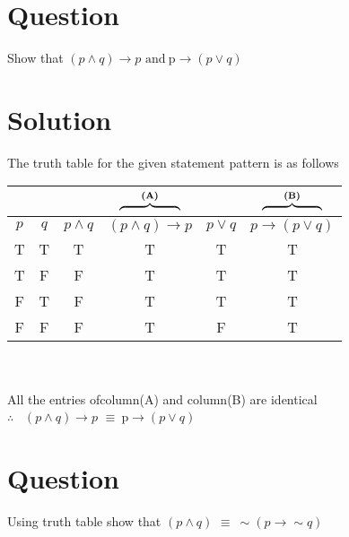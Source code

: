 \documentclass[17pt]{extarticle}
\newcommand{\lto}{\mathbin{\to}}
\begin{document}
\begin{fleqn}


\section{Question}
Show that 
$(p \wedge q)\to p$ $ \text{and} \ $p$ \to(p \vee q)$   \\

\section{Solution} 
The truth table for the given statement pattern is as follows \\
\begin{tabular}{|c*{5}{c|}}
\multicolumn{3}{c}{}&
\multicolumn{1}{c}{%
  $\overbrace{\hphantom{(p\land q)\lto p}}^{\textbf{(A)}}$%
}
&\multicolumn{1}{c}{}&
\multicolumn{1}{c}{%
  $\overbrace{\hphantom{p\lto (p\lor q)}}^{\textbf{(B)}}$%
}\\
\hline
$p$ & $q$ & $p\land q$ & $(p\land q)\lto p$ & $p\lor q$ & $p\to (p\lor q)$\\
\hline
 T & T & T & T & T & T\\
 T & F & F & T & T & T\\
 F & T & F & T & T & T\\
 F & F & F & T & F & T \\
 \hline
\end{tabular} \\ \\
All the entries ofcolumn(A) and column(B) are identical \\
$\therefore$ \ $(p \wedge q)\to p$ $ \equiv \ $p$ \to(p \vee q)$ 


\section{Question}
Using truth table show that $(p \wedge q)$ $ \equiv \ \sim(p \to \sim q)$ 



\end{fleqn}
\end{document}
